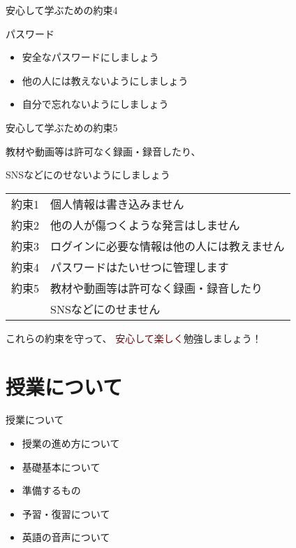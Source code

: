 \documentclass[
  ignorenonframetext,
  aspectratio=169,
  xcolor=dvipsnames]{beamer}
\providecommand{\tightlist}{%
  \setlength{\itemsep}{0pt}\setlength{\parskip}{0pt}}
\begin{document}
\begin{frame}{安心して学ぶための約束4}
\label{ux5b89ux5fc3ux3057ux3066ux5b66ux3076ux305fux3081ux306eux7d04ux675f4}
\LARGE

パスワード

\pause

\begin{itemize}[<+->]
\tightlist
\item
  安全なパスワードにしましょう
\item
  他の人には教えないようにしましょう
\item
  自分で忘れないようにしましょう
\end{itemize}
\end{frame}

\begin{frame}{安心して学ぶための約束5}
\label{ux5b89ux5fc3ux3057ux3066ux5b66ux3076ux305fux3081ux306eux7d04ux675f5}
\LARGE

教材や動画等は許可なく録画・録音したり、

SNSなどにのせないようにしましょう
\end{frame}

\begin{frame}{}
\label{section-2}
\Large

\begin{tabular}{ll}
約束1& 個人情報は書き込みません\\
約束2& 他の人が傷つくような発言はしません\\
約束3& ログインに必要な情報は他の人には教えません\\
約束4& パスワードはたいせつに管理します\\
約束5& 教材や動画等は許可なく録画・録音したり\\
&      SNSなどにのせません
\end{tabular}

\vfill

これらの\textcolor{NavyBlue}{約束を守って}、
\textcolor{Maroon}{安心して楽しく}勉強しましょう！
\end{frame}

\section{授業について}\label{ux6388ux696dux306bux3064ux3044ux3066}

\begin{frame}{授業について}
\label{ux6388ux696dux306bux3064ux3044ux3066-1}
\LARGE

\begin{itemize}[<+->]
\tightlist
\item
  授業の進め方について
\item
  基礎基本について
\item
  準備するもの
\item
  予習・復習について
\item
  英語の音声について
\end{itemize}
\end{frame}
\end{document}
